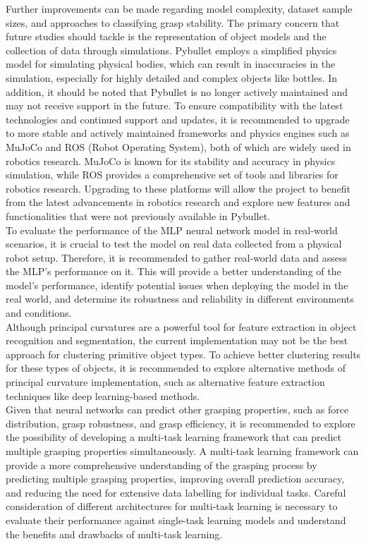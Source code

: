 \documentclass[11pt, a4paper]{report}
\begin{document}
Further improvements can be made regarding model complexity, dataset sample sizes, and approaches to classifying grasp stability. The primary concern that future studies should tackle is the representation of object models and the collection of data through simulations. Pybullet employs a simplified physics model for simulating physical bodies, which can result in inaccuracies in the simulation, especially for highly detailed and complex objects like bottles. In addition, it should be noted that Pybullet is no longer actively maintained and may not receive support in the future. To ensure compatibility with the latest technologies and continued support and updates, it is recommended to upgrade to more stable and actively maintained frameworks and physics engines such as MuJoCo and ROS (Robot Operating System), both of which are widely used in robotics research. MuJoCo is known for its stability and accuracy in physics simulation, while ROS provides a comprehensive set of tools and libraries for robotics research. Upgrading to these platforms will allow the project to benefit from the latest advancements in robotics research and explore new features and functionalities that were not previously available in Pybullet.\\

To evaluate the performance of the MLP neural network model in real-world scenarios, it is crucial to test the model on real data collected from a physical robot setup. Therefore, it is recommended to gather real-world data and assess the MLP's performance on it. This will provide a better understanding of the model's performance, identify potential issues when deploying the model in the real world, and determine its robustness and reliability in different environments and conditions.\\

Although principal curvatures are a powerful tool for feature extraction in object recognition and segmentation, the current implementation may not be the best approach for clustering primitive object types. To achieve better clustering results for these types of objects, it is recommended to explore alternative methods of principal curvature implementation, such as alternative feature extraction techniques like deep learning-based methods.\\

Given that neural networks can predict other grasping properties, such as force distribution, grasp robustness, and grasp efficiency, it is recommended to explore the possibility of developing a multi-task learning framework that can predict multiple grasping properties simultaneously. A multi-task learning framework can provide a more comprehensive understanding of the grasping process by predicting multiple grasping properties, improving overall prediction accuracy, and reducing the need for extensive data labelling for individual tasks. Careful consideration of different architectures for multi-task learning is necessary to evaluate their performance against single-task learning models and understand the benefits and drawbacks of multi-task learning.
\end{document}
